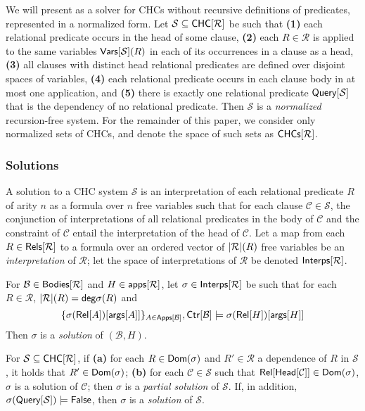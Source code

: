 We will present \sys as a solver for CHCs without recursive
definitions of predicates, represented in a normalized form.
Let $\mathcal{S} \subseteq \mathsf{CHC}[  \mathcal{R}  ]$ be such that %
\textbf{(1)} each relational predicate occurs in the head of some
clause, %
\textbf{(2)} each $R \in \mathcal{R}$ is applied to the same variables
$\mathsf{Vars}[  \mathcal{S} ](R)$ in each of its occurrences in a clause as a
head, %
\textbf{(3)} all clauses with distinct head relational predicates are
defined over disjoint spaces of variables, %
\textbf{(4)} each relational predicate occurs in each clause body in
at most one application, and %
\textbf{(5)} there is exactly one relational predicate $\mathsf{Query}[ 
  \mathcal{S}  ]$ that is the dependency of no relational predicate.
%
Then $\mathcal{S}$ is a \emph{normalized} recursion-free system.
%
For the remainder of this paper, we consider only normalized sets of
CHCs, and denote the space of such sets as $\mathsf{CHCs}[ \mathcal{R} ]$.

\subsubsection{Solutions}
\label{sec:chc-solns}
%
A solution to a CHC system $\mathcal{S}$ is an interpretation of each
relational predicate $R$ of arity $n$ as a formula over $n$ free
variables such that for each clause $\mathcal{C} \in \mathcal{S}$, the
conjunction of interpretations of all relational predicates in the
body of $\mathcal{C}$ and the constraint of $\mathcal{C}$ entail the
interpretation of the head of $\mathcal{C}$.
%
Let a map from each $R \in \mathsf{Rels}[  \mathcal{R}  ]$ to a formula over
an ordered vector of $| \mathcal{R} |(R)$ free variables be an
\emph{interpretation} of $\mathcal{R}$;
%
let the space of interpretations of $\mathcal{R}$ be denoted
$\mathsf{Interps}[  \mathcal{R}  ]$.
%
\begin{defn}
  \label{defn:chc-soln}
  For $\mathcal{B} \in \mathsf{Bodies}[  \mathcal{R}  ]$ and $H \in \mathsf{apps}[ 
    \mathcal{R}  ]$, %
  let $\sigma \in \mathsf{Interps}[  \mathcal{R}  ]$ be such that for each $R
  \in \mathcal{R}$, $|\mathcal{R}|(R) = \mathsf{deg}{\sigma(R)}$
  and %
  \[ \elts{ \sigma(\relof{ A })[ \argsof{ A } ] }_{ A \in \appsof{
      \mathcal{B} } }, %
  \ctrof{ \mathcal{B} } \entails %
  \sigma( \relof{H} )[ \argsof{ H } ]
  \]
  Then $\sigma$ is a \emph{solution} of $(\mathcal{B}, H)$.
\end{defn}
For $\mathcal{S} \subseteq \mathsf{CHC}[  \mathcal{R}  ]$, if
\textbf{(a)} for each $R \in \mathsf{Dom}(\sigma)$ and $R' \in \mathcal{R}$
a dependence of $R$ in $\mathcal{S}$, it holds that $R' \in
\mathsf{Dom}(\sigma)$;
%
\textbf{(b)} for each $\mathcal{C} \in \mathcal{S}$ such that
$\mathsf{Rel}[  \mathsf{Head}[  \mathcal{C}  ]  ] \in \mathsf{Dom}(\sigma)$, $\sigma$ is a
solution of $\mathcal{C}$;
%
then $\sigma$ is a \emph{partial solution} of $\mathcal{S}$.
%
If, in addition, $\sigma(\mathsf{Query}[  \mathcal{S}  ]) \models \mathsf{False}$,
then $\sigma$ is a \emph{solution} of $\mathcal{S}$.
%


